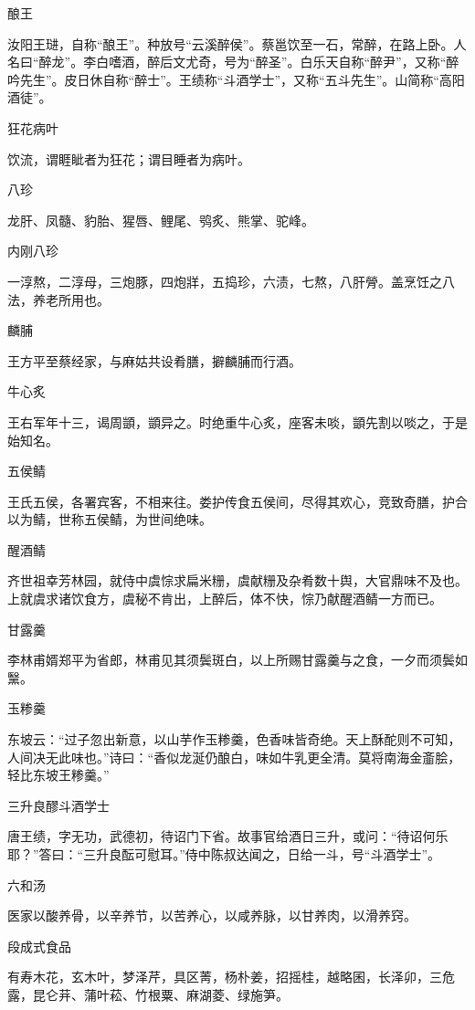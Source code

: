 \documentclass[a4paper,12pt,UTF8,twoside]{ctexbook}
\begin{document}
    酿王
    
    汝阳王琎，自称“酿王”。种放号“云溪醉侯”。蔡邕饮至一石，常醉，在路上卧。人名曰“醉龙”。李白嗜酒，醉后文尤奇，号为“醉圣”。白乐天自称“醉尹”，又称“醉吟先生”。皮日休自称“醉士”。王绩称“斗酒学士”，又称“五斗先生”。山简称“高阳酒徒”。
    
    狂花病叶
    
    饮流，谓睚眦者为狂花；谓目睡者为病叶。
    
    八珍
    
    龙肝、凤髓、豹胎、猩唇、鲤尾、鸮炙、熊掌、驼峰。
    
    内刚八珍
    
    一淳熬，二淳母，三炮豚，四炮牂，五捣珍，六渍，七熬，八肝膋。盖烹饪之八法，养老所用也。
    
    麟脯
    
    王方平至蔡经家，与麻姑共设肴膳，擗麟脯而行酒。
    
    牛心炙
    
    王右军年十三，谒周顗，顗异之。时绝重牛心炙，座客未啖，顗先割以啖之，于是始知名。
    
    五侯鲭
    
    王氏五侯，各署宾客，不相来往。娄护传食五侯间，尽得其欢心，竞致奇膳，护合以为鲭，世称五侯鲭，为世间绝味。
    
    醒酒鲭
    
    齐世祖幸芳林园，就侍中虞悰求扁米粣，虞献粣及杂肴数十舆，大官鼎味不及也。上就虞求诸饮食方，虞秘不肯出，上醉后，体不快，悰乃献醒酒鲭一方而已。
    
    甘露羹
    
    李林甫婿郑平为省郎，林甫见其须鬓斑白，以上所赐甘露羹与之食，一夕而须鬓如黳。
    
    玉糁羹
    
    东坡云：“过子忽出新意，以山芋作玉糁羹，色香味皆奇绝。天上酥酡则不可知，人间决无此味也。”诗曰：“香似龙涎仍酿白，味如牛乳更全清。莫将南海金齑脍，轻比东坡王糁羹。”
    
    三升良醪斗酒学士
    
    唐王绩，字无功，武德初，待诏门下省。故事官给酒日三升，或问：“待诏何乐耶？”答曰：“三升良酝可慰耳。”侍中陈叔达闻之，日给一斗，号“斗酒学士”。
    
    六和汤
    
    医家以酸养骨，以辛养节，以苦养心，以咸养脉，以甘养肉，以滑养窍。
    
    段成式食品
    
    有寿木花，玄木叶，梦泽芹，具区菁，杨朴姜，招摇桂，越略囷，长泽卯，三危露，昆仑茾、蒲叶菘、竹根粟、麻湖菱、绿施笋。
    
\end{document}
